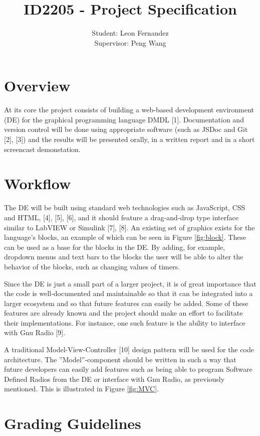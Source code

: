\documentclass[11pt]{article} %
\title{ID2205 - Project Specification}
\author{Student: Leon Fernandez\\Supervisor: Peng Wang}
\date{} %
\begin{document}
\maketitle

\section*{Overview}
At its core the project consists of building a web-based development environment (DE) for the graphical programming language DMDL [1]. Documentation and version control will be done using appropriate software (such as JSDoc and Git [2], [3]) and the results will be presented orally, in a written report and in a short screencast demonstation.

\section*{Workflow}
The DE will be built using standard web technologies such as JavaScript, CSS and HTML, [4], [5], [6], and it should feature a drag-and-drop type interface similar to LabVIEW or Simulink [7], [8]. An existing set of graphics exists for the language's blocks, an example of which can be seen in Figure \ref{fig:block}. These can be used as a base for the blocks in the DE. By adding, for example, dropdown menus and text bars to the blocks the user will be able to alter the behavior of the blocks, such as changing values of timers. 

Since the DE is just a small part of a larger project, it is of great importance that the code is well-documented and maintainable so that it can be integrated into a larger ecosystem and so that future features can easily be added. Some of these features are already known and the project should make an effort to facilitate their implementations. For instance, one such feature is the ability to interface with Gnu Radio [9].

A traditional Model-View-Controller [10] design pattern will be used for the code architecture. The ''Model''-component should be written in such a way that future developers can easily add features such as being able to program Software Defined Radios from the DE or interface with Gnu Radio, as previously mentioned. This is illustrated in Figure \ref{fig:MVC}.

\newpage
\section*{Grading Guidelines}
\end{document}
